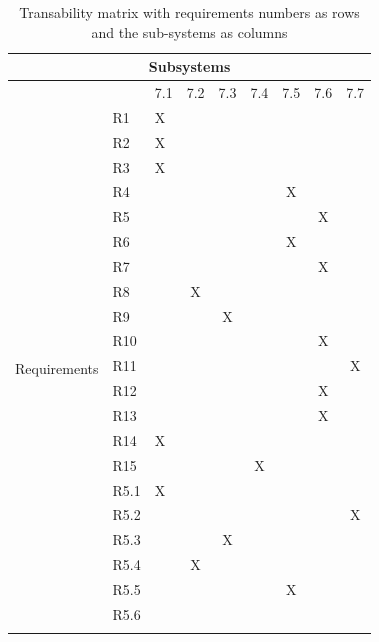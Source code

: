 \documentclass[hidelinks, 12pt, a4paper]{article}
\begin{document}
\begin{table}[H]
      \centering
      \begin{tabular}{|l|l|l|c|c|c|c|c|c|}
            \hline

            \multicolumn{9}{|c|}{Subsystems}                  \\ \hline
             &      & 7.1 & 7.2 & 7.3 & 7.4 & 7.5 & 7.6 & 7.7 \\ \hline
            \multirow{22}{*}{Requirements}
             & R1   & X   &     &     &     &     &     &     \\ \cline{2-9}
             & R2   & X   &     &     &     &     &     &     \\ \cline{2-9}
             & R3   & X   &     &     &     &     &     &     \\ \cline{2-9}
             & R4   &     &     &     &     & X   &     &     \\ \cline{2-9}
             & R5   &     &     &     &     &     & X   &     \\ \cline{2-9}
             & R6   &     &     &     &     & X   &     &     \\ \cline{2-9}
             & R7   &     &     &     &     &     & X   &     \\ \cline{2-9}
             & R8   &     & X   &     &     &     &     &     \\ \cline{2-9}
             & R9   &     &     & X   &     &     &     &     \\ \cline{2-9}
             & R10  &     &     &     &     &     & X   &     \\ \cline{2-9}
             & R11  &     &     &     &     &     &     & X   \\ \cline{2-9}
             & R12  &     &     &     &     &     & X   &     \\ \cline{2-9}
             & R13  &     &     &     &     &     & X   &     \\ \cline{2-9}
             & R14  & X   &     &     &     &     &     &     \\ \cline{2-9}
             & R15  &     &     &     & X   &     &     &     \\ \cline{2-9}
             & R5.1 & X   &     &     &     &     &     &     \\ \cline{2-9}
             & R5.2 &     &     &     &     &     &     & X   \\ \cline{2-9}
             & R5.3 &     &     & X   &     &     &     &     \\ \cline{2-9}
             & R5.4 &     & X   &     &     &     &     &     \\ \cline{2-9}
             & R5.5 &     &     &     &     & X   &     &     \\ \cline{2-9}
             & R5.6 &     &     &     &     &     &     &     \\ \cline{1-9}
      \end{tabular}
      \vspace{1cm}
      \caption{Transability matrix with requirements numbers as rows and the sub-systems as columns}
      \label{table:Could-haveRequirementsTraceabilityMatrix}
\end{table}
\end{document}
